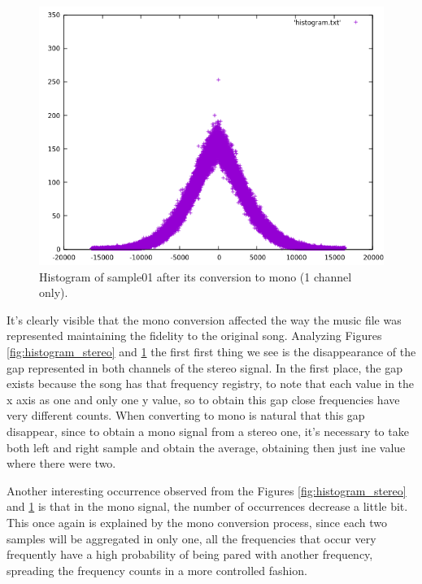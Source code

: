 \documentclass[12pt]{article}
\begin{document}
\begin{figure}[H]
  \centering
  \begin{minipage}{.5\textwidth}
    \centering
    \includegraphics[width=\linewidth]{sample01_16_1.png}
  \end{minipage}%
  \caption{{Histogram of sample01 after its conversion to mono (1 channel only).}}
  \label{fig:histogram_mono}
\end{figure}

It's clearly visible that the mono conversion affected the way the music file was represented maintaining the fidelity to the original song. Analyzing Figures \ref{fig:histogram_stereo} and \ref{fig:histogram_mono} the first first thing we see is the disappearance of the gap represented in both channels of the stereo signal. In the first place, the gap exists because the song has that frequency registry, to note that each value in the x axis as one and only one y value, so to obtain this gap close frequencies have very different counts. When converting to mono is natural that this gap disappear, since to obtain a mono signal from a stereo one, it's necessary to take both left and right sample and obtain the average, obtaining then just ine value where there were two.

Another interesting occurrence observed from the Figures \ref{fig:histogram_stereo} and \ref{fig:histogram_mono} is that in the mono signal, the number of occurrences decrease a little bit. This once again is explained by the mono conversion process, since each two samples will be aggregated in only one, all the frequencies that occur very frequently have a high probability of being pared with another frequency, spreading the frequency counts in a more controlled fashion.
\end{document}
